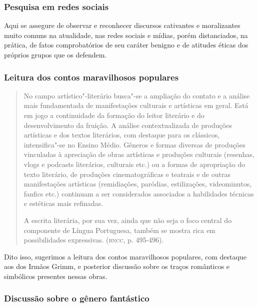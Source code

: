 \documentclass[11pt]{extarticle}
\begin{document}
\subsubsection{Pesquisa em redes sociais}


Aqui se assegure de observar e reconhecer discursos cativantes e
moralizantes muito comuns na atualidade, nas redes sociais e mídias,
porém distanciados, na prática, de fatos comprobatórios de seu caráter
benigno e de atitudes éticas dos próprios grupos que os defendem.

\subsubsection{Leitura dos contos maravilhosos populares}

\begin{quote}
No campo artístico"-literário busca"-se a ampliação do contato e a
análise mais fundamentada de manifestações culturais e artísticas em
geral. Está em jogo a continuidade da formação do leitor literário e do
desenvolvimento da fruição. A análise contextualizada de produções
artísticas e dos textos literários, com destaque para os clássicos,
intensifica"-se no Ensino Médio. Gêneros e formas diversas de produções
vinculadas à apreciação de obras artísticas e produções culturais
(resenhas, vlogs e podcasts literários, culturais etc.) ou a formas de
apropriação do texto literário, de produções cinematográficas e teatrais
e de outras manifestações artísticas (remidiações, paródias,
estilizações, videominutos, fanfics etc.) continuam a ser considerados
associados a habilidades técnicas e estéticas mais refinadas.

A escrita literária, por sua vez, ainda que não seja o foco central do
componente de Língua Portuguesa, também se mostra rica em possibilidades
expressivas. (\textsc{bncc}, p. 495-496).
\end{quote}

Dito isso, sugerimos a leitura dos contos maravilhosos populares, com
destaque aos dos Irmãos Grimm, e posterior discussão sobre os traços
românticos e simbólicos presentes nessas obras.


\subsubsection{Discussão sobre o gênero fantástico}
\end{document}
